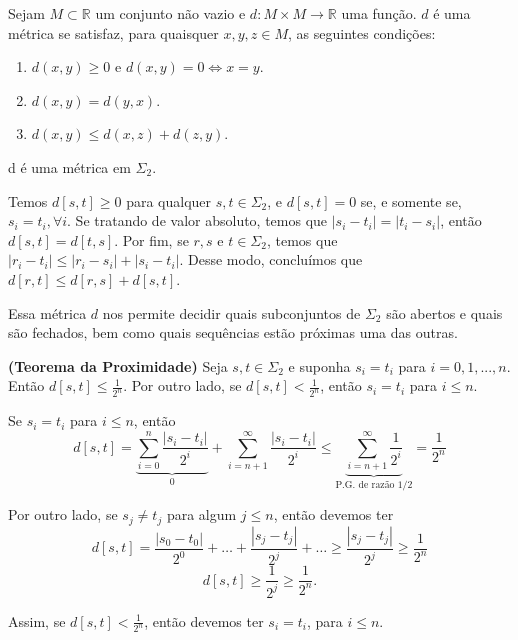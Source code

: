 \documentclass[../IC.tex]{subfiles}
\begin{document}
	\begin{definicao}
		Sejam $M \subset \mathbb{R}$ um conjunto não vazio e $d:M\times M\to\mathbb{R}$ uma função. $d$ é uma métrica se satisfaz, para quaisquer $x,y,z \in M$, as seguintes condições:
		\begin{enumerate}
			\item $d(x,y)\geq0$ e $d(x,y)=0 \iff x=y$.
			\item $d(x,y)=d(y,x)$.
			\item $d(x,y)\leq d(x,z)+d(z,y)$.
		\end{enumerate}
	\end{definicao}
	
	\begin{proposicao}\label{proposicaoMetrica}
		d é uma métrica em $\Sigma_2$.
	\end{proposicao}
	
	\begin{prova}
		Temos $d[s,t] \geq 0$ para qualquer $s,t \in \Sigma_2$, e $d[s,t]=0$ se, e somente se, $s_i=t_i, \forall i$. Se tratando de valor absoluto, temos que $|s_i-t_i|=|t_i-s_i|$, então $d[s,t] = d[t,s]$. Por fim, se $r,s \text{ e } t \in \Sigma_2$, temos que $|r_i-t_i|\leq|r_i-s_i|+|s_i-t_i|$. Desse modo, concluímos que $d[r,t]\leq d[r,s]+d[s,t]$.
	\end{prova}
	
	Essa métrica $d$ nos permite decidir quais subconjuntos de $\Sigma_2$ são abertos e quais são fechados, bem como quais sequências estão próximas uma das outras.
	
	\begin{teorema}
		\textbf{(Teorema da Proximidade)} Seja $s,t \in \Sigma_2$ e suponha $s_i=t_i$ para $i=0,1,...,n$. Então $d[s,t] \leq \frac{1}{2^n}$. Por outro lado, se $d[s,t]<\frac{1}{2^n}$, então $s_i=t_i$ para $i\leq n$.
	\end{teorema}
	
	\begin{prova}
		Se $s_i=t_i$ para $i\leq n$, então
		$$d[s,t]=\underbrace{\sum_{i=0}^{n}\frac{|s_i-t_i|}{2^i}}_{\text{0}} + \sum_{i=n+1}^{\infty}\frac{|s_i-t_i|}{2^i} \leq \underbrace{\sum_{i=n+1}^{\infty}\frac{1}{2^i}}_{\text{P.G. de razão 1/2}} = \frac{1}{2^n}$$
		
		Por outro lado, se $s_j \neq t_j$ para algum $j\leq n$, então devemos ter
		$$d[s,t] = \frac{|s_0 - t_0|}{2^0} + \dots + \frac{|s_j - t_j|}{2^j} + \dots \geq \frac{|s_j - t_j|}{2^j} \geq \frac{1}{2^n}$$
		$$d[s,t] \geq \frac{1}{2^j} \geq \frac{1}{2^n}.$$
		
		Assim, se $d[s,t]<\frac{1}{2^n}$, então devemos ter $s_i=t_i$, para $i\leq n$.
	\end{prova}
	
\end{document}
